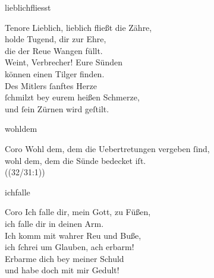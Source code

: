 \documentclass[shorttitlesize=55,tocstyle=ref-genre]{ees}
\begin{document}
{\begin{movement}{lieblichfliesst}
  \item[Tenore]
  Lieblich, lieblich fließt die Zähre,\\
  holde Tugend, dir zur Ehre,\\
  die der Reue Wangen füllt.\\
  Weint, Verbrecher! Eure Sünden\\
  können einen Tilger finden.\\
  Des Mitlers ſanftes Herze\\
  ſchmilzt bey eurem heißen Schmerze,\\
  und ſein Zürnen wird geſtilt.
\end{movement}

\begin{movement}{wohldem}
  \item[Coro]
  Wohl dem, dem die Uebertretungen vergeben ſind,\\
  wohl dem, dem die Sünde bedecket iſt.\\
  ((32/31:1))
\end{movement}

\begin{movement}{ichfalle}
  \item[Coro]
  Ich falle dir, mein Gott, zu Füßen,\\
  ich falle dir in deinen Arm.\\
  Ich komm mit wahrer Reu und Buße,\\
  ich ſchrei um Glauben, ach erbarm!\\
  Erbarme dich bey meiner Schuld\\
  und habe doch mit mir Gedult!
\end{movement}

}
\end{document}
